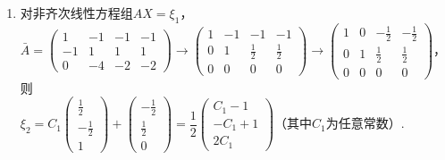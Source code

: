\begin{exercise}
\begin{exgroup}
        \begin{answer}
            \begin{enumerate}
                \item 对非齐次线性方程组$AX=\xi_1$，\\
                      $\bar{A}=\begin{pmatrix}
                              1  & -1 & -1 & -1 \\
                              -1 & 1  & 1  & 1  \\
                              0  & -4 & -2 & -2
                          \end{pmatrix}
                          \rightarrow\begin{pmatrix}
                              1 & -1 & -1       & -1       \\
                              0 & 1  & \frac 12 & \frac 12 \\
                              0 & 0  & 0        & 0
                          \end{pmatrix}
                          \rightarrow\begin{pmatrix}
                              1 & 0 & -\frac 12 & -\frac 12 \\
                              0 & 1 & \frac 12  & \frac 12  \\
                              0 & 0 & 0         & 0
                          \end{pmatrix}$，则\\
                      $\xi_2=C_1\begin{pmatrix}
                              \frac 12  \\
                              -\frac 12 \\
                              1
                          \end{pmatrix} + \begin{pmatrix}
                              -\frac 12 \\
                              \frac 12  \\
                              0
                          \end{pmatrix}=\dfrac 12\begin{pmatrix}
                              C_1 - 1  \\
                              -C_1 + 1 \\
                              2C_1
                          \end{pmatrix}$（其中$C_1$为任意常数）.\\

\end{enumerate}
\end{answer}
\end{exgroup}
\end{exercise}
